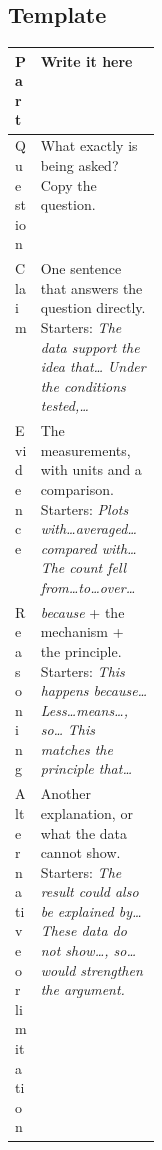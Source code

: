 \documentclass[11pt,letterpaper]{article}
\begin{document}
\subsection*{Template}
\par
\begin{tabularx}{\linewidth}{@{}p{0.17\linewidth}Y@{}}\toprule
Part & Write it here\\\midrule
Question & What exactly is being asked? Copy the question.\\[18pt]
Claim & One sentence that answers the question directly. Starters: \textit{The data support the idea that\ldots} \textit{Under the conditions tested,\ldots}\\[18pt]
Evidence & The measurements, with units and a comparison. Starters: \textit{Plots with\ldots averaged\ldots compared with\ldots} \textit{The count fell from\ldots to\ldots over\ldots}\\[26pt]
Reasoning & \textit{because} + the mechanism + the principle. Starters: \textit{This happens because\ldots} \textit{Less\ldots means\ldots, so\ldots} \textit{This matches the principle that\ldots}\\[26pt]
Alternative or limitation & Another explanation, or what the data cannot show. Starters: \textit{The result could also be explained by\ldots} \textit{These data do not show\ldots, so\ldots would strengthen the argument.}\\[18pt]\bottomrule
\end{tabularx}
\par
\end{document}
